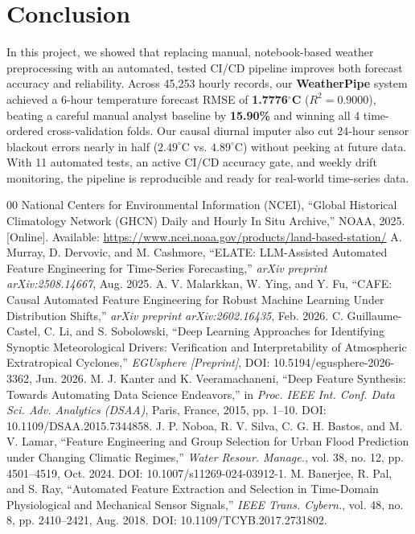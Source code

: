 \documentclass[conference]{IEEEtran}
\begin{document}
\section{Conclusion}
In this project, we showed that replacing manual, notebook-based weather preprocessing with an automated, tested CI/CD pipeline improves both forecast accuracy and reliability. Across 45,253 hourly records, our \textbf{WeatherPipe} system achieved a 6-hour temperature forecast RMSE of \textbf{1.7776$^\circ$C} ($R^2 = 0.9000$), beating a careful manual analyst baseline by \textbf{15.90\%} and winning all 4 time-ordered cross-validation folds. Our causal diurnal imputer also cut 24-hour sensor blackout errors nearly in half ($2.49^\circ\text{C}$ vs. $4.89^\circ\text{C}$) without peeking at future data. With 11 automated tests, an active CI/CD accuracy gate, and weekly drift monitoring, the pipeline is reproducible and ready for real-world time-series data.

\begin{thebibliography}{00}
 National Centers for Environmental Information (NCEI), ``Global Historical Climatology Network (GHCN) Daily and Hourly In Situ Archive,'' NOAA, 2025. [Online]. Available: \url{https://www.ncei.noaa.gov/products/land-based-station/}
 A. Murray, D. Dervovic, and M. Cashmore, ``ELATE: LLM-Assisted Automated Feature Engineering for Time-Series Forecasting,'' \textit{arXiv preprint arXiv:2508.14667}, Aug. 2025.
 A. V. Malarkkan, W. Ying, and Y. Fu, ``CAFE: Causal Automated Feature Engineering for Robust Machine Learning Under Distribution Shifts,'' \textit{arXiv preprint arXiv:2602.16435}, Feb. 2026.
 C. Guillaume-Castel, C. Li, and S. Sobolowski, ``Deep Learning Approaches for Identifying Synoptic Meteorological Drivers: Verification and Interpretability of Atmospheric Extratropical Cyclones,'' \textit{EGUsphere [Preprint]}, DOI: 10.5194/egusphere-2026-3362, Jun. 2026.
 M. J. Kanter and K. Veeramachaneni, ``Deep Feature Synthesis: Towards Automating Data Science Endeavors,'' in \textit{Proc. IEEE Int. Conf. Data Sci. Adv. Analytics (DSAA)}, Paris, France, 2015, pp. 1--10. DOI: 10.1109/DSAA.2015.7344858.
 J. P. Noboa, R. V. Silva, C. G. H. Bastos, and M. V. Lamar, ``Feature Engineering and Group Selection for Urban Flood Prediction under Changing Climatic Regimes,'' \textit{Water Resour. Manage.}, vol. 38, no. 12, pp. 4501--4519, Oct. 2024. DOI: 10.1007/s11269-024-03912-1.
 M. Banerjee, R. Pal, and S. Ray, ``Automated Feature Extraction and Selection in Time-Domain Physiological and Mechanical Sensor Signals,'' \textit{IEEE Trans. Cybern.}, vol. 48, no. 8, pp. 2410--2421, Aug. 2018. DOI: 10.1109/TCYB.2017.2731802.
\end{thebibliography}
\end{document}
